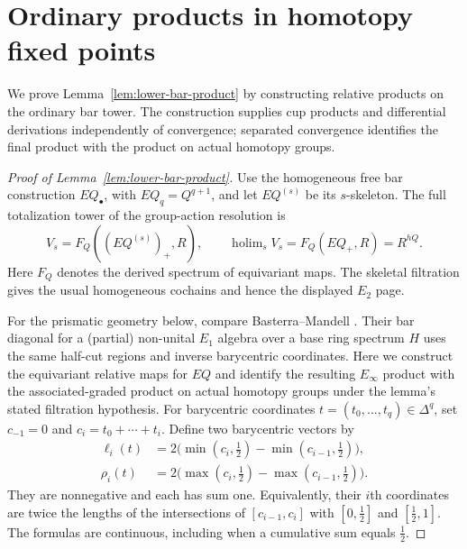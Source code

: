 \section{Ordinary products in homotopy fixed points}\label{sec:ordinary-products}
We prove Lemma~\ref{lem:lower-bar-product} by constructing relative
products on the ordinary bar tower. The construction supplies cup
products and differential derivations independently of convergence;
separated convergence identifies the final product with the product
on actual homotopy groups.

\begin{proof}[Proof of Lemma~\ref{lem:lower-bar-product}]
Use the homogeneous free bar construction $EQ_\bullet$, with
$EQ_q=Q^{q+1}$, and let $EQ^{(s)}$ be its $s$-skeleton.  The full
totalization tower of the group-action resolution is
\[
 V_s=F_Q((EQ^{(s)})_+,R),\qquad
 \operatorname{holim}_sV_s=F_Q(EQ_+,R)=R^{hQ}.
\]
Here $F_Q$ denotes the derived spectrum of equivariant maps.  The
skeletal filtration gives the usual homogeneous cochains and hence the
displayed $E_2$ page.

For the prismatic geometry below, compare Basterra--Mandell
\cite[proof of Theorem~7.1, pp.~23--26]{basterra-mandell2013}.
Their bar diagonal for a (partial) non-unital $E_1$ algebra over a base
ring spectrum $H$ uses the
same half-cut regions and inverse barycentric coordinates. Here we
construct the equivariant relative maps for $EQ$ and identify the
resulting $E_\infty$ product with the associated-graded product on actual
homotopy groups under the lemma's stated filtration hypothesis.
For barycentric coordinates $t=(t_0,\ldots,t_q)\in\Delta^q$, set
$c_{-1}=0$ and $c_i=t_0+\cdots+t_i$.  Define two barycentric vectors by
\begin{equation}\label{eq:lower-half-cut}
 \begin{split}
 \ell_i(t)&=2\bigl(\min(c_i,\tfrac12)-\min(c_{i-1},\tfrac12)\bigr),\\
 \rho_i(t)&=2\bigl(\max(c_i,\tfrac12)-\max(c_{i-1},\tfrac12)\bigr).
 \end{split}
\end{equation}
They are nonnegative and each has sum one.  Equivalently, their $i$th
coordinates are twice the lengths of the intersections of
$[c_{i-1},c_i]$ with $[0,\tfrac12]$ and $[\tfrac12,1]$.  The formulas
are continuous, including when a cumulative sum equals $\tfrac12$.


\end{proof}

